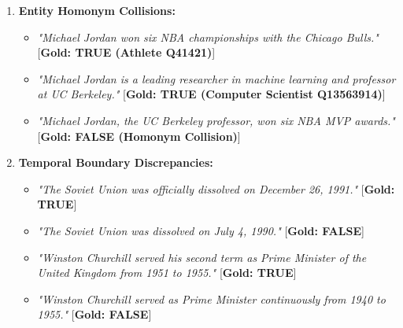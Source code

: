 \begin{enumerate}
    \item \textbf{Entity Homonym Collisions:}
    \begin{itemize}
        \item \textit{"Michael Jordan won six NBA championships with the Chicago Bulls."} \hfill [\textbf{Gold: TRUE (Athlete Q41421)}]
        \item \textit{"Michael Jordan is a leading researcher in machine learning and professor at UC Berkeley."} \hfill [\textbf{Gold: TRUE (Computer Scientist Q13563914)}]
        \item \textit{"Michael Jordan, the UC Berkeley professor, won six NBA MVP awards."} \hfill [\textbf{Gold: FALSE (Homonym Collision)}]
    \end{itemize}

    \item \textbf{Temporal Boundary Discrepancies:}
    \begin{itemize}
        \item \textit{"The Soviet Union was officially dissolved on December 26, 1991."} \hfill [\textbf{Gold: TRUE}]
        \item \textit{"The Soviet Union was dissolved on July 4, 1990."} \hfill [\textbf{Gold: FALSE}]
        \item \textit{"Winston Churchill served his second term as Prime Minister of the United Kingdom from 1951 to 1955."} \hfill [\textbf{Gold: TRUE}]
        \item \textit{"Winston Churchill served as Prime Minister continuously from 1940 to 1955."} \hfill [\textbf{Gold: FALSE}]
    \end{itemize}
\end{enumerate}
